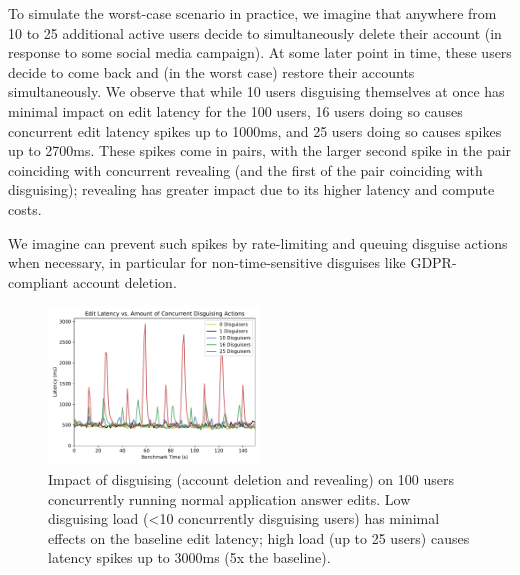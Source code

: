 To simulate the worst-case scenario in practice, we imagine that anywhere from 10 to 25 additional
active users decide to simultaneously delete their account (\eg in response to some social media
campaign). At some later point in time, these users decide to come back and (in the worst case)
restore their accounts simultaneously. We observe that while 10 users disguising themselves at once
has minimal impact on edit latency for the 100 users, 16 users doing so causes
concurrent edit latency spikes up to 1000ms, and 25 users doing so causes spikes up to 2700ms.  
%
These spikes come in pairs, with the larger second spike in the pair coinciding with concurrent
revealing (and the first of the pair coinciding with disguising); revealing has greater impact due
to its higher latency and compute costs.

We imagine \sys can prevent such spikes by rate-limiting and queuing disguise actions when
necessary, in particular for non-time-sensitive disguises like GDPR-compliant account deletion.

\begin{figure}[t!]
    \centering
        \includegraphics[width=0.5\textwidth]{figs/concurrent_results_20lec_100users}
    \caption{Impact of disguising (account deletion and revealing) on 100 users concurrently running
    normal application answer edits. Low disguising load (<10 concurrently disguising users) has
    minimal effects on the baseline edit latency; high load (up to 25 users) causes latency spikes
    up to 3000ms (5x the baseline).} 
    \label{fig:concurrent}
\end{figure}
